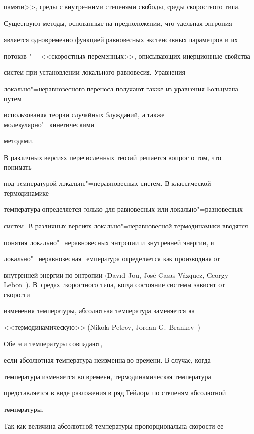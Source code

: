 памяти>>, среды с внутренними степенями свободы, среды скоростного типа.

Существуют методы, основанные на предположении, что удельная энтропия

является одновременно функцией равновесных экстенсивных параметров и их

потоков "--- <<скоростных переменных>>, описывающих инерционные свойства

систем при установлении локального равновесия. Уравнения

локально"=неравновесного переноса получают также из уравнения Больцмана путем

использования теории случайных блужданий, а также молекулярно"=кинетическими

методами.



В различных версиях перечисленных теорий решается вопрос о том, что понимать

под температурой локально"=неравновесных систем. В классической термодинамике

температура определяется только для равновесных или локально"=равновесных

систем. В различных версиях локально"=неравновесной термодинамики вводятся

понятия локально"=неравновесных энтропии и внутренней энергии, и

локально"=неравновесная температура определяется как производная от

внутренней энергии по энтропии (David~Jou,  Jos\'e Casas-V\'azquez, Georgy Lebon~\mbox{\cite{kud:Lebon, kud:bib5}}). В~средах скоростного типа, когда состояние системы зависит от скорости

изменения температуры, абсолютная температура заменяется на

<<термодинамическую>> (Nikola Petrov, Jordan G.~Brankov~\cite{kud:Brankov}) 

Обе эти температуры совпадают,

если абсолютная температура неизменна во времени. В случае, когда

температура изменяется во времени, термодинамическая температура

представляется в виде разложения в ряд Тейлора по степеням абсолютной

температуры.



Так как величина абсолютной температуры пропорциональна скорости ее

